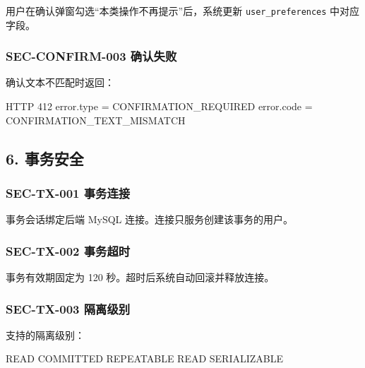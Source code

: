 \documentclass[
  a4paper,
  UTF8]{ctexart}
\newenvironment{Shaded}{}{}
\newcommand{\NormalTok}[1]{#1}
\begin{document}
用户在确认弹窗勾选``本类操作不再提示''后，系统更新
\texttt{user\_preferences} 中对应字段。

\hypertarget{sec-confirm-003-ux786eux8ba4ux5931ux8d25}{%
\subsubsection{SEC-CONFIRM-003
确认失败}\label{sec-confirm-003-ux786eux8ba4ux5931ux8d25}}

确认文本不匹配时返回：

\begin{Shaded}
\begin{Highlighting}[]
\NormalTok{HTTP 412}
\NormalTok{error.type = CONFIRMATION\_REQUIRED}
\NormalTok{error.code = CONFIRMATION\_TEXT\_MISMATCH}
\end{Highlighting}
\end{Shaded}

\hypertarget{ux4e8bux52a1ux5b89ux5168}{%
\subsection{6. 事务安全}\label{ux4e8bux52a1ux5b89ux5168}}

\hypertarget{sec-tx-001-ux4e8bux52a1ux8fdeux63a5}{%
\subsubsection{SEC-TX-001
事务连接}\label{sec-tx-001-ux4e8bux52a1ux8fdeux63a5}}

事务会话绑定后端 MySQL 连接。连接只服务创建该事务的用户。

\hypertarget{sec-tx-002-ux4e8bux52a1ux8d85ux65f6}{%
\subsubsection{SEC-TX-002
事务超时}\label{sec-tx-002-ux4e8bux52a1ux8d85ux65f6}}

事务有效期固定为 120 秒。超时后系统自动回滚并释放连接。

\hypertarget{sec-tx-003-ux9694ux79bbux7ea7ux522b}{%
\subsubsection{SEC-TX-003
隔离级别}\label{sec-tx-003-ux9694ux79bbux7ea7ux522b}}

支持的隔离级别：

\begin{Shaded}
\begin{Highlighting}[]
\NormalTok{READ COMMITTED}
\NormalTok{REPEATABLE READ}
\NormalTok{SERIALIZABLE}
\end{Highlighting}
\end{Shaded}
\end{document}
